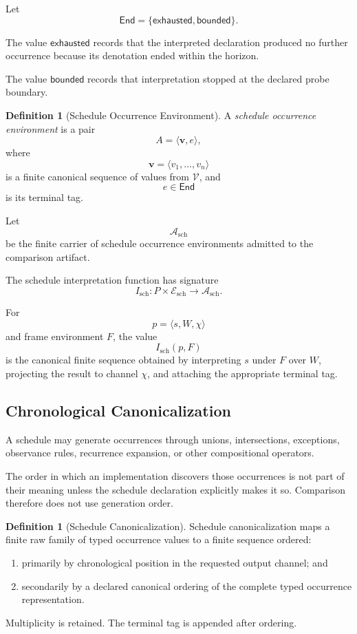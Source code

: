 \documentclass[11pt]{article}
\theoremstyle{plain}
\theoremstyle{definition}
\newtheorem{definition}[theorem]{Definition}
\theoremstyle{remark}
\begin{document}
Let
\[
  \mathsf{End}
  =
  \{
  \mathsf{exhausted},
  \mathsf{bounded}
  \}.
\]

The value \(\mathsf{exhausted}\)
records that the interpreted declaration
produced no further occurrence
because its denotation ended within the horizon.

The value \(\mathsf{bounded}\)
records that interpretation stopped
at the declared probe boundary.

\begin{definition}[Schedule Occurrence Environment]
  \label{ik.def.schedule-occurrence-environment}
  A \emph{schedule occurrence environment} is a pair
  \[
    A
    =
    \langle
    \mathbf{v},
    e
    \rangle,
  \]
  where
  \[
    \mathbf{v}
    =
    \langle
    v_1,
    \ldots,
    v_n
    \rangle
  \]
  is a finite canonical sequence
  of values from \(\mathcal{V}\),
  and
  \[
    e\in\mathsf{End}
  \]
  is its terminal tag.
\end{definition}

Let
\[
  \mathcal{A}_{\mathrm{sch}}
\]
be the finite carrier
of schedule occurrence environments
admitted to the comparison artifact.

The schedule interpretation function has signature
\[
  I_{\mathrm{sch}}:
  P
  \times
  \mathcal{E}_{\mathrm{sch}}
  \longrightarrow
  \mathcal{A}_{\mathrm{sch}}.
\]

For
\[
  p
  =
  \langle
  s,
  W,
  \chi
  \rangle
\]
and frame environment \(F\),
the value
\[
  I_{\mathrm{sch}}(p,F)
\]
is the canonical finite sequence
obtained by interpreting \(s\)
under \(F\) over \(W\),
projecting the result to channel \(\chi\),
and attaching the appropriate terminal tag.

\subsection{Chronological Canonicalization}

A schedule may generate occurrences
through unions,
intersections,
exceptions,
observance rules,
recurrence expansion,
or other compositional operators.

The order in which an implementation discovers those occurrences
is not part of their meaning
unless the schedule declaration explicitly makes it so.
Comparison therefore does not use
generation order.

\begin{definition}[Schedule Canonicalization]
  \label{ik.def.schedule-canonicalization}
  Schedule canonicalization maps
  a finite raw family of typed occurrence values
  to a finite sequence ordered:
  \begin{enumerate}[label=(\alph*)]
    \item primarily by chronological position
          in the requested output channel; and
    \item secondarily by a declared canonical ordering
          of the complete typed occurrence representation.
  \end{enumerate}

  Multiplicity is retained.
  The terminal tag is appended after ordering.
\end{definition}
\end{document}
